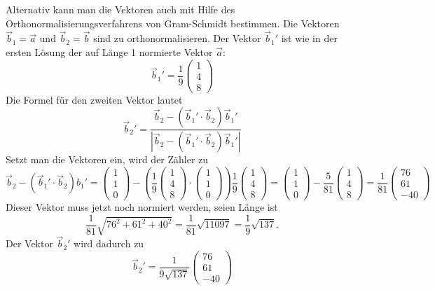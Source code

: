 \begin{loesung}
Alternativ kann man die Vektoren auch mit Hilfe des
Orthonormalisierungsverfahrens von Gram-Schmidt bestimmen.
Die Vektoren $\vec b_1=\vec a$ und $\vec b_2=\vec b$ sind 
zu orthonormalisieren.
Der Vektor $\vec b_1'$ ist wie in der ersten Lösung der auf Länge 1 normierte
Vektor $\vec a$:
\[
\vec b_1' 
=
\frac19
\begin{pmatrix}
1\\4\\8
\end{pmatrix}
\]
Die Formel für den zweiten Vektor lautet
\[
\vec b_2'=\frac{
\vec b_2-(\vec b_1'\cdot \vec b_2)\vec b_1'
}{
|\vec b_2-(\vec b_1'\cdot \vec b_2)\vec b_1'|
}
\]
Setzt man die Vektoren ein, wird der Zähler zu
\[
\vec b_2-(\vec b_1'\cdot \vec b_2)b_1'
=
\begin{pmatrix}
1\\1\\0
\end{pmatrix}
-\left(
\frac19
\begin{pmatrix}
1\\4\\8
\end{pmatrix}
\cdot
\begin{pmatrix}
1\\1\\0
\end{pmatrix}
\right)
\frac19
\begin{pmatrix}
1\\4\\8
\end{pmatrix}
=
\begin{pmatrix}
1\\1\\0
\end{pmatrix}
-
\frac5{81}
\begin{pmatrix}
1\\4\\8
\end{pmatrix}
=
\frac1{81}\begin{pmatrix}
76\\
61\\
-40
\end{pmatrix}
\]
Dieser Vektor muss jetzt noch normiert werden, seien Länge ist
\[
\frac1{81}\sqrt{76^2+61^2+40^2}
=
\frac1{81}\sqrt{11097}
=
\frac19
\sqrt{137}.
\]
Der Vektor $\vec b_2'$ wird dadurch zu
\[
\vec b_2'
=
\frac1{9\sqrt{137}}\begin{pmatrix}
76\\
61\\
-40
\end{pmatrix}
\]
\end{loesung}
